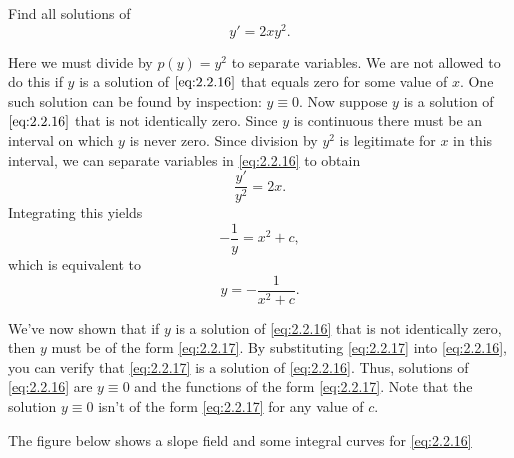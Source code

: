 \documentclass{ximera}
\begin{document}
\begin{example}\label{example:2.2.4}
Find all solutions of
\begin{equation} \label{eq:2.2.16}
y'=2xy^2.
\end{equation}
 
\begin{explanation}
Here we must divide by $p(y)=y^2$ to separate variables.
We are not allowed to do this if $y$ is a solution of $\eqref{eq:2.2.16}$ that
equals zero for some value of $x$. One such solution can be found by
inspection:  $y \equiv 0$. Now suppose $y$ is a solution
of $\eqref{eq:2.2.16}$ that is not identically zero. Since $y$ is continuous there must be an interval on which $y$ is never zero. Since division
by $y^2$ is legitimate for $x$ in this interval, we can separate
variables in \eqref{eq:2.2.16} to obtain
$$
\frac{y'}{y^2}=2x.
$$
 Integrating this yields
$$
-\frac{1}{y}=x^2+c,
$$
which is equivalent to
\begin{equation} \label{eq:2.2.17}
y=-\frac{1}{x^2+c}.
\end{equation}
 
We've now shown that if $y$ is a solution of \eqref{eq:2.2.16} that is
not identically zero, then $y$ must be of the form \eqref{eq:2.2.17}. By
substituting \eqref{eq:2.2.17} into \eqref{eq:2.2.16}, you can verify that
\eqref{eq:2.2.17} is  a solution of \eqref{eq:2.2.16}. Thus,
 solutions of \eqref{eq:2.2.16} are $y\equiv 0$ and the functions
of the form \eqref{eq:2.2.17}. Note that the solution $y\equiv 0$ isn't  of
the form \eqref{eq:2.2.17} for any value of $c$.
 
The figure below shows a slope field and some integral
curves for \eqref{eq:2.2.16}

 \begin{center}
\end{center}
 
\end{explanation}
\end{example}
 
\end{document}
